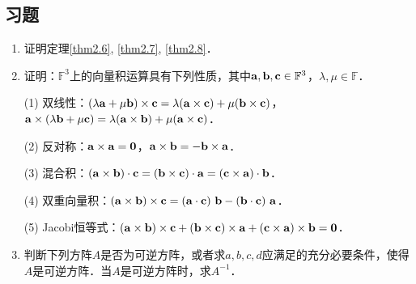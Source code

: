 \documentclass[a4paper,fontset=windows]{ctexbook}
\theoremstyle{definition}
\begin{document}
\subsection*{习题}

\begin{enumerate}
\item 证明定理\ref{thm2.6}, \ref{thm2.7}, \ref{thm2.8}．

\item 证明：$\mathbb{F}^3$上的向量积运算具有下列性质，其中${\bf a,b,c}\in\mathbb{F}^3$，$\lambda,\mu\in\mathbb{F}$．

(1) 双线性：${\bf(\lambda a+\mu b)\times c=\lambda(a\times c)+\mu(b\times c)}$，${\bf a\times(\lambda b+\mu c)=\lambda(a\times b)+\mu(a\times c)}$．

(2) 反对称：${\bf a\times a=0}$，${\bf a\times b=-b\times a}$．

(3) 混合积：${\bf(a\times b)\cdot c=(b\times c)\cdot a=(c\times a)\cdot b}$．

(4) 双重向量积：${\bf(a\times b)\times c=(a\cdot c)~b-(b\cdot c)~a}$．

(5) Jacobi恒等式：${\bf(a\times b)\times c+(b\times c)\times a+(c\times a)\times b=0}$．

\item 判断下列方阵$A$是否为可逆方阵，或者求$a,b,c,d$应满足的充分必要条件，使得$A$是可逆方阵．当$A$是可逆方阵时，求$A^{-1}$．


\end{enumerate}
\end{document}
